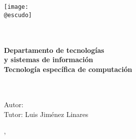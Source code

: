 \begin{titlepage}
    \makeatletter
	\begin{center}
        \vspace{1cm}
		\texttt{[image: \\@escudo]}\vspace{1cm}
		
		{\LARGE \textbf{\@instEdu \\[0.5ex]
				\@centroEdu}}\\[0.5cm]
		{\Large \textbf{Departamento de tecnologías}}\\ \smallskip%
        {\Large\textbf{y sistemas de información}}\\[0.5cm]
		{\large \textbf{Tecnología específica de computación}}\\[1.5cm]
		{\LARGE \textbf{\@tipoDoc}}\\[1cm]
		
		
		{\LARGE \textbf{\@tituloPrimera}}\\ \smallskip%
		\ifdefined\@tituloSegunda{\LARGE \textbf{\@tituloSegunda}}
		\else \phantom{\LARGE Texto fantasma}
		\fi
	\end{center}
	\vfill%
	\begin{flushleft}
		{\Large Autor: \@autor} \\ \bigskip%
		{\Large Tutor: Luis Jiménez Linares} \\ \bigskip%
	\end{flushleft}
	\vspace{2cm}%
	\begin{flushright}
		{\Large \ifspanish \@mesTF \else \@monthTF \fi, \@yearTF}
	\end{flushright}
	\cleardoublepage
    \makeatother
\end{titlepage}
	









